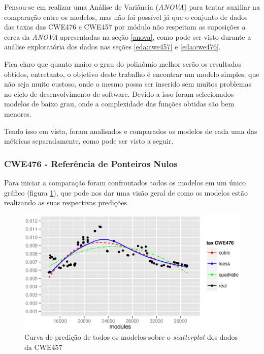 Pensou-se em realizar uma Análise de Variância (\textit{ANOVA}) para tentar
auxiliar na comparação entre os modelos, mas não foi possível já que o conjunto
de dados das taxas das CWE476 e CWE457 por módulo não respeitam as suposições a
cerca da \textit{ANOVA} apresentadas na seção \ref{anova}, como pode ser visto
durante a análise exploratória dos dados nas seções \ref{eda:cwe457} e
\ref{eda:cwe476}.

Fica claro que quanto maior o grau do polinômio melhor serão os resultados
obtidos, entretanto, o objetivo deste trabalho é encontrar um modelo simples,
que não seja muito custoso, onde o mesmo possa ser inserido sem muitos problemas
no ciclo de desenvolvimento de software. Devido a isso foram selecionados
modelos de baixo grau, onde a complexidade das funções obtidas são bem menores.

Tendo isso em vista, foram analisados e comparados os modelos de cada uma das
métricas separadamente, como pode ser visto a seguir.

\subsubsection{CWE476 - Referência de Ponteiros Nulos}

Para iniciar a comparação foram confrontados todos os modelos em um único
gráfico (figura \ref{fig:cwe476-all-models}), que pode nos dar uma visão geral de
como os modelos estão realizando as suas respectivas predições.

\begin{figure}[h]
  \centering
  \includegraphics[width=1.0\textwidth]
      {figuras/cwe476-all-models.eps}
      \caption{Curva de predição de todos os modelos sobre o \textit{scatterplot}
      dos dados da CWE457}
  \label{fig:cwe476-all-models}
\end{figure}

